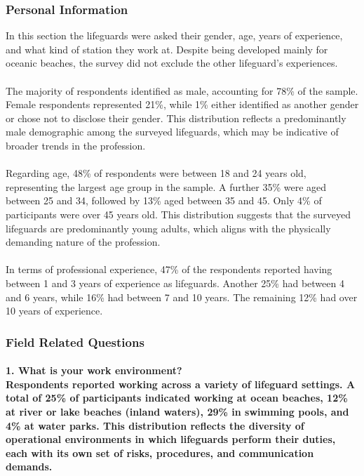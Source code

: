 \subsubsection{\textbf{Personal Information}}
In this section the lifeguards were asked their gender, age, years of experience, and what kind of station they work at. Despite being developed mainly for oceanic beaches, the survey did not exclude the other lifeguard's experiences.
\\
\\
The majority of respondents identified as male, accounting for 78\% of the sample. Female respondents represented 21\%, while 1\% either identified as another gender or chose not to disclose their gender. This distribution reflects a predominantly male demographic among the surveyed lifeguards, which may be indicative of broader trends in the profession.
\\
\\
Regarding age, 48\% of respondents were between 18 and 24 years old, representing the largest age group in the sample. A further 35\% were aged between 25 and 34, followed by 13\% aged between 35 and 45. Only 4\% of participants were over 45 years old. This distribution suggests that the surveyed lifeguards are predominantly young adults, which aligns with the physically demanding nature of the profession.
\\
\\
In terms of professional experience, 47\% of the respondents reported having between 1 and 3 years of experience as lifeguards. Another 25\% had between 4 and 6 years, while 16\% had between 7 and 10 years. The remaining 12\% had over 10 years of experience.

\subsubsection{\textbf{Field Related Questions}}

\paragraph{
\textbf{1. What is your work environment?}
\\
Respondents reported working across a variety of lifeguard settings. A total of 25\% of participants indicated working at ocean beaches, 12\% at river or lake beaches (inland waters), 29\% in swimming pools, and 4\% at water parks. This distribution reflects the diversity of operational environments in which lifeguards perform their duties, each with its own set of risks, procedures, and communication demands.}

